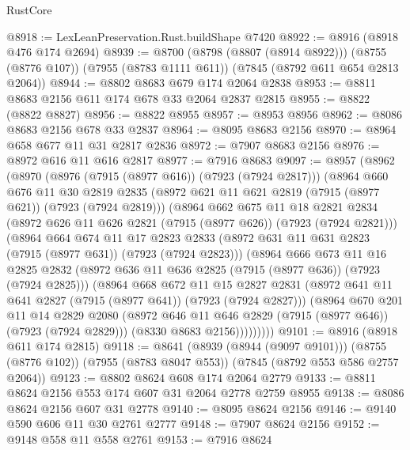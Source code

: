 \begin{lexlean}{RustCore}
\begin{coremodule}
@8918 := LexLeanPreservation.Rust.buildShape @7420
@8922 := @8916 (@8918 @476 @174 @2694)
@8939 := @8700
    (@8798 (@8807 (@8914 @8922)))
    (@8755 (@8776 @107))
    (@7955 (@8783 @1111 @611))
    (@7845 (@8792 @611 @654 @2813 @2064))
@8944 := @8802 @8683 @679 @174 @2064 @2838
@8953 := @8811 @8683 @2156 @611 @174 @678 @33 @2064 @2837 @2815
@8955 := @8822 (@8822 @8827)
@8956 := @8822 @8955
@8957 := @8953 @8956
@8962 := @8086 @8683 @2156 @678 @33 @2837
@8964 := @8095 @8683 @2156
@8970 := @8964 @658 @677 @11 @31 @2817 @2836
@8972 := @7907 @8683 @2156
@8976 := @8972 @616 @11 @616 @2817
@8977 := @7916 @8683
@9097 := @8957
    (@8962
      (@8970
        (@8976 (@7915 (@8977 @616)) (@7923 (@7924 @2817)))
        (@8964
          @660
          @676
          @11
          @30
          @2819
          @2835
          (@8972 @621 @11 @621 @2819 (@7915 (@8977 @621)) (@7923 (@7924 @2819)))
          (@8964
            @662
            @675
            @11
            @18
            @2821
            @2834
            (@8972 @626 @11 @626 @2821 (@7915 (@8977 @626)) (@7923 (@7924 @2821)))
            (@8964
              @664
              @674
              @11
              @17
              @2823
              @2833
              (@8972 @631 @11 @631 @2823 (@7915 (@8977 @631)) (@7923 (@7924 @2823)))
              (@8964
                @666
                @673
                @11
                @16
                @2825
                @2832
                (@8972 @636 @11 @636 @2825 (@7915 (@8977 @636)) (@7923 (@7924 @2825)))
                (@8964
                  @668
                  @672
                  @11
                  @15
                  @2827
                  @2831
                  (@8972 @641 @11 @641 @2827 (@7915 (@8977 @641)) (@7923 (@7924 @2827)))
                  (@8964
                    @670
                    @201
                    @11
                    @14
                    @2829
                    @2080
                    (@8972 @646 @11 @646 @2829 (@7915 (@8977 @646)) (@7923 (@7924 @2829)))
                    (@8330 @8683 @2156)))))))))
@9101 := @8916 (@8918 @611 @174 @2815)
@9118 := @8641
    (@8939 (@8944 (@9097 @9101)))
    (@8755 (@8776 @102))
    (@7955 (@8783 @8047 @553))
    (@7845 (@8792 @553 @586 @2757 @2064))
@9123 := @8802 @8624 @608 @174 @2064 @2779
@9133 := @8811 @8624 @2156 @553 @174 @607 @31 @2064 @2778 @2759 @8955
@9138 := @8086 @8624 @2156 @607 @31 @2778
@9140 := @8095 @8624 @2156
@9146 := @9140 @590 @606 @11 @30 @2761 @2777
@9148 := @7907 @8624 @2156
@9152 := @9148 @558 @11 @558 @2761
@9153 := @7916 @8624

\end{coremodule}
\end{lexlean}

